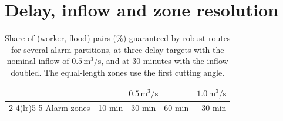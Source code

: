 \documentclass[11pt,a4paper]{article}
\begin{document}
\section{Delay, inflow and zone resolution}\label{app:extra}
\begin{table}[htbp]
\centering\small
\caption{Share of (worker, flood) pairs (\%) guaranteed by robust routes for several alarm partitions, at three delay targets with the nominal inflow of $0.5\,\mathrm{m^3/s}$, and at 30 minutes with the inflow doubled. The equal-length zones use the first cutting angle.}\label{tab:extra}
\begin{tabular}{@{}lrrrr@{}}\toprule
& \multicolumn{3}{c}{$0.5\,\mathrm{m^3/s}$} & $1.0\,\mathrm{m^3/s}$\\\cmidrule(lr){2-4}\cmidrule(lr){5-5}
Alarm zones & 10 min & 30 min & 60 min & 30 min\\\midrule

\end{tabular}
\end{table}
\end{document}

